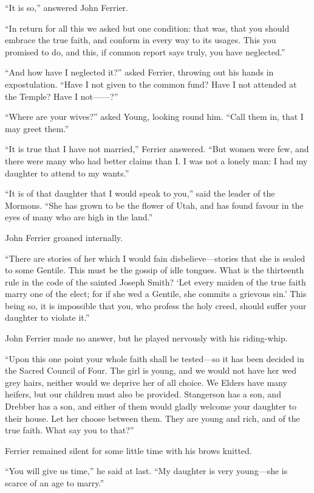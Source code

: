 \documentclass[12pt]{book}
\begin{document}
“It is so,” answered John Ferrier. 

“In return for all this we asked but one condition: that was, that you should embrace the true faith, and conform in every way to its usages. This you promised to do, and this, if common report says truly, you have neglected.” 

“And how have I neglected it?” asked Ferrier, throwing out his hands in expostulation. “Have I not given to the common fund? Have I not attended at the Temple? Have I not——?” 

“Where are your wives?” asked Young, looking round him. “Call them in, that I may greet them.” 

“It is true that I have not married,” Ferrier answered. “But women were few, and there were many who had better claims than I. I was not a lonely man: I had my daughter to attend to my wants.” 

“It is of that daughter that I would speak to you,” said the leader of the Mormons. “She has grown to be the flower of Utah, and has found favour in the eyes of many who are high in the land.” 

John Ferrier groaned internally. 

“There are stories of her which I would fain disbelieve—stories that she is sealed to some Gentile. This must be the gossip of idle tongues. What is the thirteenth rule in the code of the sainted Joseph Smith? ‘Let every maiden of the true faith marry one of the elect; for if she wed a Gentile, she commits a grievous sin.’ This being so, it is impossible that you, who profess the holy creed, should suffer your daughter to violate it.” 

John Ferrier made no answer, but he played nervously with his riding-whip. 

“Upon this one point your whole faith shall be tested—so it has been decided in the Sacred Council of Four. The girl is young, and we would not have her wed grey hairs, neither would we deprive her of all choice. We Elders have many heifers, but our children must also be provided. Stangerson has a son, and Drebber has a son, and either of them would gladly welcome your daughter to their house. Let her choose between them. They are young and rich, and of the true faith. What say you to that?” 

Ferrier remained silent for some little time with his brows knitted. 

“You will give us time,” he said at last. “My daughter is very young—she is scarce of an age to marry.” 
\end{document}
